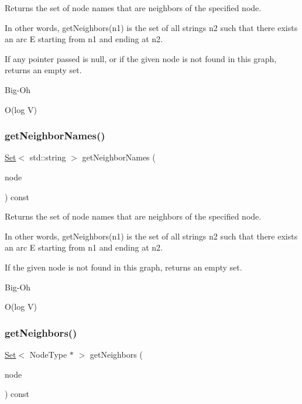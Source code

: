 Returns the set of node names that are neighbors of the specified node. 

In other words, get\+Neighbors(n1) is the set of all strings n2 such that there exists an arc E starting from n1 and ending at n2.

If any pointer passed is null, or if the given node is not found in this graph, returns an empty set. \begin{DoxyRefDesc}{Big-\/\+Oh}
\item[\mbox{\hyperlink{BigOh__BigOh000071}{Big-\/\+Oh}}]O(log V) \end{DoxyRefDesc}
\mbox{\label{classGraph_a6175b4d672266465dd34e070c7710b34}} 
\subsubsection{\texorpdfstring{get\+Neighbor\+Names()}{getNeighborNames()}\hspace{0.1cm}{\footnotesize\ttfamily [2/2]}}
{\footnotesize\ttfamily \mbox{\hyperlink{classstanfordcpplib_1_1collections_1_1GenericSet}{Set}}$<$ std\+::string $>$ get\+Neighbor\+Names (\begin{DoxyParamCaption}\item[{const std\+::string \&}]{node }\end{DoxyParamCaption}) const}



Returns the set of node names that are neighbors of the specified node. 

In other words, get\+Neighbors(n1) is the set of all strings n2 such that there exists an arc E starting from n1 and ending at n2.

If the given node is not found in this graph, returns an empty set. \begin{DoxyRefDesc}{Big-\/\+Oh}
\item[\mbox{\hyperlink{BigOh__BigOh000072}{Big-\/\+Oh}}]O(log V) \end{DoxyRefDesc}
\mbox{\label{classGraph_a0e49b167f0623a8ae76040c3e5eab3fb}} 
\subsubsection{\texorpdfstring{get\+Neighbors()}{getNeighbors()}\hspace{0.1cm}{\footnotesize\ttfamily [1/2]}}
{\footnotesize\ttfamily \mbox{\hyperlink{classstanfordcpplib_1_1collections_1_1GenericSet}{Set}}$<$ Node\+Type $\ast$ $>$ get\+Neighbors (\begin{DoxyParamCaption}\item[{Node\+Type $\ast$}]{node }\end{DoxyParamCaption}) const}



